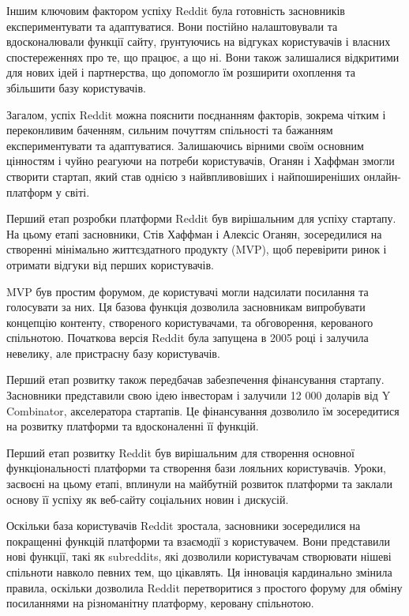 \documentclass[oneside,14pt]{extarticle}
\begin{document}
Іншим ключовим фактором успіху Reddit була готовність засновників експериментувати та адаптуватися. Вони постійно налаштовували та вдосконалювали функції сайту, ґрунтуючись на відгуках користувачів і власних спостереженнях про те, що працює, а що ні. Вони також залишалися відкритими для нових ідей і партнерства, що допомогло їм розширити охоплення та збільшити базу користувачів.

Загалом, успіх Reddit можна пояснити поєднанням факторів, зокрема чітким і переконливим баченням, сильним почуттям спільності та бажанням експериментувати та адаптуватися. Залишаючись вірними своїм основним цінностям і чуйно реагуючи на потреби користувачів, Оганян і Хаффман змогли створити стартап, який став однією з найвпливовіших і найпоширеніших онлайн-платформ у світі.

Перший етап розробки платформи Reddit був вирішальним для успіху стартапу. На цьому етапі засновники, Стів Хаффман і Алексіс Оганян, зосередилися на створенні мінімально життєздатного продукту (MVP), щоб перевірити ринок і отримати відгуки від перших користувачів.

MVP був простим форумом, де користувачі могли надсилати посилання та голосувати за них. Ця базова функція дозволила засновникам випробувати концепцію контенту, створеного користувачами, та обговорення, керованого спільнотою. Початкова версія Reddit була запущена в 2005 році і залучила невелику, але пристрасну базу користувачів.

Перший етап розвитку також передбачав забезпечення фінансування стартапу. Засновники представили свою ідею інвесторам і залучили 12 000 доларів від Y Combinator, акселератора стартапів. Це фінансування дозволило їм зосередитися на розвитку платформи та вдосконаленні її функцій.

Перший етап розвитку Reddit був вирішальним для створення основної функціональності платформи та створення бази лояльних користувачів. Уроки, засвоєні на цьому етапі, вплинули на майбутній розвиток платформи та заклали основу її успіху як веб-сайту соціальних новин і дискусій.

Оскільки база користувачів Reddit зростала, засновники зосередилися на покращенні функцій платформи та взаємодії з користувачем. Вони представили нові функції, такі як subreddits, які дозволили користувачам створювати нішеві спільноти навколо певних тем, що цікавлять. Ця інновація кардинально змінила правила, оскільки дозволила Reddit перетворитися з простого форуму для обміну посиланнями на різноманітну платформу, керовану спільнотою.
\end{document}
